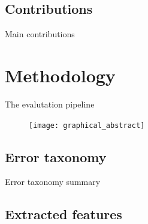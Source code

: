 \documentclass[export]{beamer}
\begin{document}
        \subsection{Contributions}
            \begin{frame}{Main contributions}
                
            \end{frame}

    \section{Methodology}
        \begin{frame}{The evalutation pipeline}
            \begin{figure}
                \texttt{[image: graphical\_abstract]}
            \end{figure}
        \end{frame}

        \subsection{Error taxonomy}
            \begin{frame}{Error taxonomy summary}
                \begin{figure}
                    
                \end{figure}
            \end{frame}
        \subsection{Extracted features}
\end{document}
